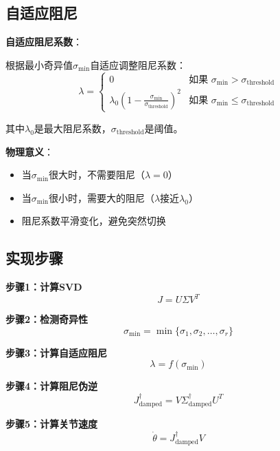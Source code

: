 \documentclass[12pt,a4paper]{article}
\begin{document}
\subsection{自适应阻尼}

\textbf{自适应阻尼系数}：

根据最小奇异值$\sigma_{\min}$自适应调整阻尼系数：
\begin{equation}
\lambda = \begin{cases}
0 & \text{如果 } \sigma_{\min} > \sigma_{\text{threshold}} \\
\lambda_0\left(1 - \frac{\sigma_{\min}}{\sigma_{\text{threshold}}}\right)^2 & \text{如果 } \sigma_{\min} \leq \sigma_{\text{threshold}}
\end{cases}
\end{equation}

其中$\lambda_0$是最大阻尼系数，$\sigma_{\text{threshold}}$是阈值。

\textbf{物理意义}：
\begin{itemize}
\item 当$\sigma_{\min}$很大时，不需要阻尼（$\lambda = 0$）
\item 当$\sigma_{\min}$很小时，需要大的阻尼（$\lambda$接近$\lambda_0$）
\item 阻尼系数平滑变化，避免突然切换
\end{itemize}

\subsection{实现步骤}

\textbf{步骤1：计算SVD}
\begin{equation}
J = U\Sigma V^T
\end{equation}

\textbf{步骤2：检测奇异性}
\begin{equation}
\sigma_{\min} = \min\{\sigma_1, \sigma_2, \ldots, \sigma_r\}
\end{equation}

\textbf{步骤3：计算自适应阻尼}
\begin{equation}
\lambda = f(\sigma_{\min})
\end{equation}

\textbf{步骤4：计算阻尼伪逆}
\begin{equation}
J^{\dagger}_{\text{damped}} = V\Sigma^{\dagger}_{\text{damped}}U^T
\end{equation}

\textbf{步骤5：计算关节速度}
\begin{equation}
\dot{\theta} = J^{\dagger}_{\text{damped}}V
\end{equation}
\end{document}
